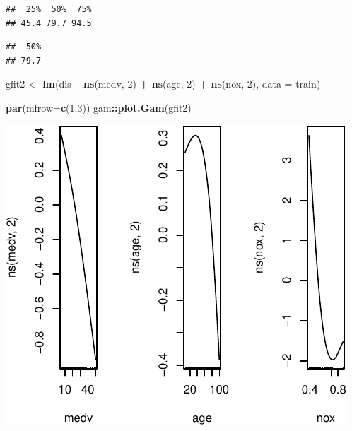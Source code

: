 \documentclass[]{article}
\newenvironment{Shaded}{\begin{snugshade}}{\end{snugshade}}
\newcommand{\DataTypeTok}[1]{\textcolor[rgb]{0.13,0.29,0.53}{#1}}
\newcommand{\DecValTok}[1]{\textcolor[rgb]{0.00,0.00,0.81}{#1}}
\newcommand{\KeywordTok}[1]{\textcolor[rgb]{0.13,0.29,0.53}{\textbf{#1}}}
\newcommand{\NormalTok}[1]{#1}
\newcommand{\OperatorTok}[1]{\textcolor[rgb]{0.81,0.36,0.00}{\textbf{#1}}}
\newcommand{\StringTok}[1]{\textcolor[rgb]{0.31,0.60,0.02}{#1}}
\begin{document}
\begin{Shaded}
\end{Shaded}

\begin{verbatim}
##  25%  50%  75% 
## 45.4 79.7 94.5
\end{verbatim}

\begin{Shaded}
\end{Shaded}

\begin{verbatim}
##  50% 
## 79.7
\end{verbatim}

\begin{Shaded}
\begin{Highlighting}[]
\NormalTok{gfit2 <-}\StringTok{  }\KeywordTok{lm}\NormalTok{(dis }\OperatorTok{~}\StringTok{ }\KeywordTok{ns}\NormalTok{(medv, }\DecValTok{2}\NormalTok{) }\OperatorTok{+}\StringTok{ }\KeywordTok{ns}\NormalTok{(age, }\DecValTok{2}\NormalTok{) }\OperatorTok{+}\StringTok{ }\KeywordTok{ns}\NormalTok{(nox, }\DecValTok{2}\NormalTok{), }\DataTypeTok{data =}\NormalTok{ train)}

\KeywordTok{par}\NormalTok{(}\DataTypeTok{mfrow=}\KeywordTok{c}\NormalTok{(}\DecValTok{1}\NormalTok{,}\DecValTok{3}\NormalTok{))}
\NormalTok{gam}\OperatorTok{::}\KeywordTok{plot.Gam}\NormalTok{(gfit2)}
\end{Highlighting}
\end{Shaded}

\begin{center}\includegraphics{sol_A4_files/figure-latex/unnamed-chunk-9-1} \end{center}
\end{document}
